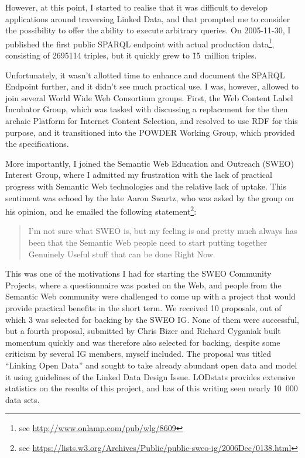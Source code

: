 However, at this point, I started to realise that it was difficult to
develop applications around traversing Linked Data, and that
prompted me to consider the possibility to offer the ability to
execute arbitrary queries. On 2005-11-30, I published the first public
SPARQL endpoint with actual production data\footnote{see
  \url{http://www.onlamp.com/pub/wlg/8609}}, consisting of 2695114
triples, but it quickly grew to \~15~million triples.

Unfortunately, it wasn't allotted time to enhance and document the
SPARQL Endpoint further, and it didn't see much practical use. 
I was, however, allowed to join several World Wide Web Consortium
groups. First, the Web Content Label Incubator Group, which was tasked
with discussing a replacement for the then archaic Platform for
Internet Content Selection, and resolved to use RDF for this
purpose, and it transitioned into the POWDER Working Group, which
provided the specifications. 

More importantly, I joined the Semantic Web Education and Outreach
(SWEO) Interest Group, where I admitted my frustration with the lack
of practical progress with Semantic Web technologies and the relative
lack of uptake. This sentiment was echoed by the late Aaron Swartz,
who was asked by the group on his opinion, and he emailed the
following statement\footnote{see
  \url{https://lists.w3.org/Archives/Public/public-sweo-ig/2006Dec/0138.html}}:
\begin{quote}
I'm not sure what SWEO is, but my feeling is and pretty much always
has been that the Semantic Web people need to start putting together
Genuinely Useful stuff that can be done Right Now.
\end{quote}

This was one of the motivations I had for starting the SWEO Community
Projects, where a questionnaire was posted on the Web, and people from
the Semantic Web community were challenged to come up with a project
that would provide practical benefits in the short term. We received
10 proposals, out of which 3 was selected for backing by the SWEO
IG. None of them were successful, but a fourth proposal, submitted by
Chris Bizer and Richard Cyganiak built momentum quickly and was
therefore also selected for backing, despite some criticism by several
IG members, myself included. The proposal was titled ``Linking Open
Data'' and sought to take already abundant open data and model it
using guidelines of the Linked Data Design
Issue\cite{linkeddataissue}. LODstats\cite{auer2012lodstats} provides
extensive statistics on the results of this project, and has of this
writing seen nearly 10~000 data sets.

